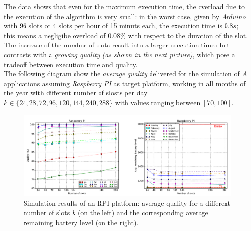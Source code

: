 \documentclass[10pt,a4paper]{report}
\theoremstyle{definition}
\begin{document}
The data shows that even for the maximum execution time, the overload due to the execution of the algorithm is very small: in the worst case, given by \textit{Arduino} with 96 slots or 4 slots per hour of 15 minuts each, the execution time is $0.8s$; this means a negligibe overload of $0.08\%$ with respect to the duration of the slot. The increase of the number of slots result into a larger execution times but contrasts with a \textit{growing quality (as shown in the next picture)}, which pose a tradeoff between execution time and quality.\\

The following diagram show the 	\textit{average quality} delivered for the simulation of $A$ applications assuming \textit{Raspberry PI} as target platform, working in all months of the year with different number of slosts per day $k \in \{24,28,72,96,120,144,240,288\}$ with values ranging between $[70,100]$. 
\begin{figure}[h]
	\centering\includegraphics[scale=0.30]{images/Pasted image 20230515151827.png}
	\caption{Simulation results of an RPI platform: average quality for a different number of slots $k$ (on the left) and the corresponding average remaining battery level (on the right).}
	\label{rpi-quality-avg-battery}
\end{figure}
\end{document}
